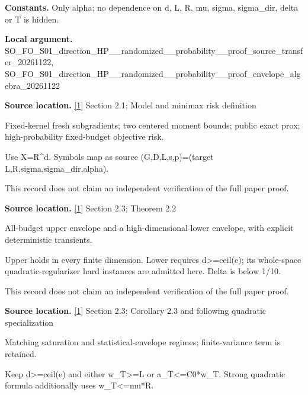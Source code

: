 \documentclass[10pt,a4paper]{article}
\begin{document}
\textbf{Constants.} Only alpha; no dependence on d, L, R, mu, sigma, sigma\_dir, delta or T is hidden.



\textbf{Local argument.} SO\_FO\_S01\_direction\_HP\_\_\allowbreak{}randomized\_\_probability\_\allowbreak{}\_proof\_source\_transfer\_2\allowbreak{}0261122, SO\_FO\_S01\_direction\_HP\_\_\allowbreak{}randomized\_\_probability\_\allowbreak{}\_proof\_envelope\_algebra\_\allowbreak{}20261122



\textbf{Source location.} \href{https://arxiv.org/html/2610.00260v2}{[1]} Section 2.1; Model and minimax risk definition



Fixed-kernel fresh subgradients; two centered moment bounds; public exact prox; high-probability fixed-budget objective risk.



Use X=R\textasciicircum{}d. Symbols map as source (G,D,L,s,p)=(target L,R,sigma,sigma\_dir,alpha).



This record does not claim an independent verification of the full paper proof.



\textbf{Source location.} \href{https://arxiv.org/html/2610.00260v2}{[1]} Section 2.3; Theorem 2.2



All-budget upper envelope and a high-dimensional lower envelope, with explicit deterministic transients.



Upper holds in every finite dimension. Lower requires d>=ceil(e); its whole-space quadratic-regularizer hard instances are admitted here. Delta is below 1/10.



This record does not claim an independent verification of the full paper proof.



\textbf{Source location.} \href{https://arxiv.org/html/2610.00260v2}{[1]} Section 2.3; Corollary 2.3 and following quadratic specialization



Matching saturation and statistical-envelope regimes; finite-variance term is retained.



Keep d>=ceil(e) and either w\_T>=L or a\_T<=C0*w\_T. Strong quadratic formula additionally uses w\_T<=mu*R.
\end{document}
